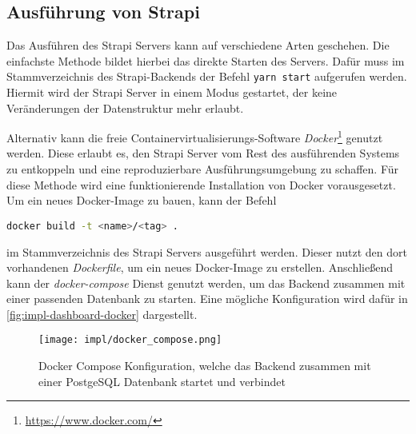 \subsection{Ausführung von Strapi}

Das Ausführen des Strapi Servers kann auf verschiedene Arten geschehen. Die
einfachste Methode bildet hierbei das direkte Starten des Servers. Dafür muss im
Stammverzeichnis des Strapi-Backends der Befehl \lstinline[style=code, language=bash, style=inline]{yarn start} aufgerufen werden. Hiermit wird der
Strapi Server in einem Modus gestartet, der keine Veränderungen der
Datenstruktur mehr erlaubt.

Alternativ kann die freie Containervirtualisierungs-Software
\textit{Docker}\footnote{\url{https://www.docker.com/}} genutzt werden. Diese
erlaubt es, den Strapi Server vom Rest des ausführenden Systems zu entkoppeln
und eine reproduzierbare Ausführungsumgebung zu schaffen. Für diese Methode wird
eine funktionierende Installation von Docker vorausgesetzt. Um ein neues
Docker-Image zu bauen, kann der Befehl

\lstinline[style=code,language=bash, style=inline]{docker build -t <name>/<tag> .}

im Stammverzeichnis des Strapi Servers ausgeführt werden. Dieser nutzt den dort
vorhandenen \textit{Dockerfile}, um ein neues Docker-Image zu erstellen.
Anschließend kann der \textit{docker-compose} Dienst genutzt werden, um das
Backend zusammen mit einer passenden Datenbank zu starten. Eine mögliche
Konfiguration wird dafür in \autoref{fig:impl-dashboard-docker} dargestellt.

\begin{figure}[htpb]
    \centering
    \texttt{[image: impl/docker\_compose.png]}
    \caption{Docker Compose Konfiguration, welche das Backend zusammen mit einer PostgeSQL Datenbank startet und verbindet}
    \label{fig:impl-dashboard-docker}
\end{figure}